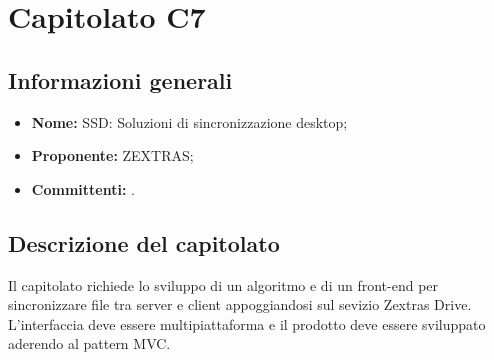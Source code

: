 \section{Capitolato C7}

\subsection{Informazioni generali}
\begin{itemize}
\item \textbf{Nome:} SSD: Soluzioni di sincronizzazione desktop;
\item \textbf{Proponente:} ZEXTRAS;
\item \textbf{Committenti:} \committenti{}.
\end{itemize}

\subsection{Descrizione del capitolato}
Il capitolato richiede lo sviluppo di un algoritmo e di un front-end per sincronizzare file tra server e client appoggiandosi sul sevizio Zextras Drive.
L'interfaccia deve essere multipiattaforma e il prodotto deve essere sviluppato aderendo al pattern MVC.

